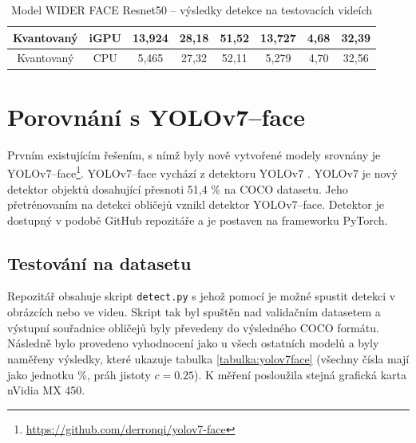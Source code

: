 \begin{table}[H]
\begin{tabular}{cc|ccc|ccc|}
  \multicolumn{1}{|c|}{\cellcolor[HTML]{E0DBDB}Kvantovaný}     & \cellcolor[HTML]{E0DBDB}iGPU & \multicolumn{1}{c|}{13,924}                                 & \multicolumn{1}{c|}{28,18}                                  & 51,52          & \multicolumn{1}{c|}{13,727}                                 & \multicolumn{1}{c|}{4,68}                                   & 32,39          \\ \hline
  \multicolumn{1}{|c|}{\cellcolor[HTML]{E0DBDB}Kvantovaný}     & \cellcolor[HTML]{E0DBDB}CPU  & \multicolumn{1}{c|}{5,465}                                  & \multicolumn{1}{c|}{27,32}                                  & 52,11          & \multicolumn{1}{c|}{5,279}                                  & \multicolumn{1}{c|}{4,70}                                   & 32,56          \\ \hline
  \end{tabular}
  \label{tabulka:wfrvidea}
  \caption{Model WIDER FACE Resnet50 -- výsledky detekce na testovacích videích}
\end{table}


\section{Porovnání s YOLOv7--face}
\label{sekce:yolov7}
Prvním existujícím řešením, s nímž byly nově vytvořené modely srovnány je YOLOv7--face\footnote{\url{https://github.com/derronqi/yolov7-face}}. YOLOv7--face vychází z detektoru YOLOv7 \cite{yolov7}. YOLOv7 je nový detektor objektů dosahující přesnoti 51,4 \% na COCO datasetu. Jeho přetrénovaním na detekci obličejů vznikl detektor YOLOv7--face. Detektor je dostupný v podobě GitHub repozitáře a je postaven na frameworku PyTorch.

\subsection*{Testování na datasetu}
Repozitář obsahuje skript \texttt{detect.py} s jehož pomocí je možné spustit detekci v obrázcích nebo ve videu. Skript tak byl spuštěn nad validačním datasetem a výstupní souřadnice obličejů byly převedeny do výsledného COCO formátu. Následně bylo provedeno vyhodnocení jako u všech ostatních modelů a byly naměřeny výsledky, které ukazuje tabulka \ref{tabulka:yolov7face} (všechny čísla mají jako jednotku \%, práh jistoty $c=0.25$). K měření posloužila stejná grafická karta nVidia MX 450.

